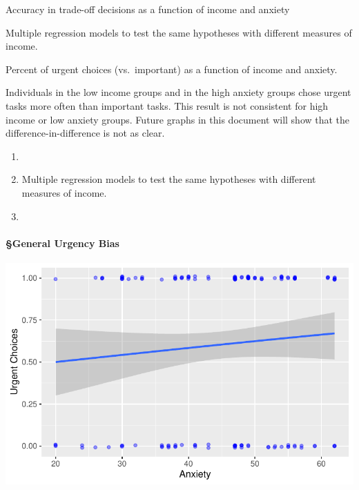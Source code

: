 Accuracy in trade-off decisions as a function of income and anxiety

Multiple regression models to test the same hypotheses with different
measures of income.

Percent of urgent choices (vs.~important) as a function of income and
anxiety.

\begin{tcolorbox}[enhanced jigsaw, colbacktitle=quarto-callout-note-color!10!white, colframe=quarto-callout-note-color-frame, arc=.35mm, leftrule=.75mm, bottomrule=.15mm, title=\textcolor{quarto-callout-note-color}{\faInfo}\hspace{0.5em}{Key Result}, rightrule=.15mm, colback=white, opacityback=0, coltitle=black, toptitle=1mm, bottomtitle=1mm, breakable, toprule=.15mm, left=2mm, titlerule=0mm, opacitybacktitle=0.6]

Individuals in the low income groups and in the high anxiety groups
chose urgent tasks more often than important tasks. This result is not
consistent for high income or low anxiety groups. Future graphs in this
document will show that the difference-in-difference is not as clear.

\end{tcolorbox}

\begin{enumerate}
\def\labelenumi{\arabic{enumi}.}
\item
\item
  Multiple regression models to test the same hypotheses with different
  measures of income.
\item
\end{enumerate}

\hypertarget{general-urgency-bias}{%
\paragraph{§General Urgency Bias}\label{general-urgency-bias}}

\includegraphics{thesis-file-ppq_files/figure-latex/pca-stai-urg-bias-1.pdf}

